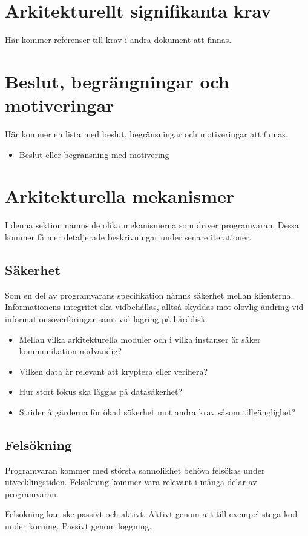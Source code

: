 \section{Arkitekturellt signifikanta krav}
Här kommer referenser till krav i andra dokument att finnas.
\section{Beslut, begrängningar och motiveringar}
Här kommer en lista med beslut, begränsningar och motiveringar att finnas.
\begin{itemize}
\item Beslut eller begränsning med motivering
\end{itemize}
\section{Arkitekturella mekanismer}
I denna sektion nämns de olika mekanismerna som driver programvaran. Dessa kommer få mer detaljerade beskrivningar under senare iterationer.
\subsection{Säkerhet}
Som en del av programvarans specifikation nämns säkerhet mellan klienterna. Informationens integritet ska vidbehållas, alltså skyddas mot olovlig ändring vid informationsöverföringar samt vid lagring på hårddisk.

\begin{itemize}
\item Mellan vilka arkitekturella moduler och i vilka instanser är säker kommunikation nödvändig?
\item Vilken data är relevant att kryptera eller verifiera?
\item Hur stort fokus ska läggas på datasäkerhet?
\item Strider åtgärderna för ökad sökerhet mot andra krav såsom tillgänglighet?
\end{itemize}
\subsection{Felsökning}
Programvaran kommer med största sannolikhet behöva felsökas under utvecklingstiden. Felsökning kommer vara relevant i många delar av programvaran.

Felsökning kan ske passivt och aktivt. Aktivt genom att till exempel stega kod under körning. Passivt genom loggning.

